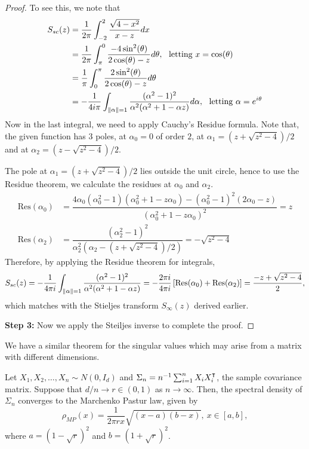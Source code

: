 \documentclass[12pt]{article}
\begin{document}
\begin{proof}
    To see this, we note that
    \begin{align*}
        S_{sc}(z) 
        & = \dfrac{1}{2\pi} \int_{-2}^2 \dfrac{\sqrt{4 - x^2}}{x - z}dx\\
        & = \dfrac{1}{2\pi} \int_{\pi}^0 \dfrac{-4\sin^2(\theta)}{2\cos(\theta) - z} d\theta, \ \text{ letting } x = \cos(\theta)\\
        & = \dfrac{1}{\pi} \int_0^\pi \dfrac{2\sin^2(\theta)}{2\cos(\theta) - z}d\theta\\
        & = -\dfrac{1}{4i\pi} \int_{\norm{\alpha} = 1} \dfrac{(\alpha^2 - 1)^2}{\alpha^2 (\alpha^2 + 1 - \alpha z)}d\alpha, \ \text{ letting } \alpha = e^{i\theta}
    \end{align*}
    \noindent Now in the last integral, we need to apply Cauchy's Residue formula. Note that, the given function has 3 poles, at $\alpha_0 = 0$ of order $2$, at $\alpha_1 = (z+\sqrt{z^2-4})/2$ and at $\alpha_2 = (z-\sqrt{z^2-4})/2$. 

    The pole at $\alpha_1 = (z + \sqrt{z^2-4})/2$ lies outside the unit circle, hence to use the Residue theorem, we calculate the residues at $\alpha_0$ and $\alpha_2$. 
    \begin{align*}
        \text{Res}(\alpha_0)
        & = \dfrac{4\alpha_0(\alpha_0^2 - 1)(\alpha_0^2 + 1 - z\alpha_0) - (\alpha_0^2 - 1)^2(2\alpha_0 - z)}{(\alpha^2_0 + 1 - z\alpha_0)^2} = z\\
        \text{Res}(\alpha_2)
        & = \dfrac{(\alpha_2^2 - 1)^2}{\alpha_2^2 (\alpha_2 - (z + \sqrt{z^2 -4})/2)} = -\sqrt{z^2-4}
    \end{align*}
    \noindent Therefore, by applying the Residue theorem for integrals,
    \begin{equation*}
        S_{sc}(z) = -\dfrac{1}{4\pi i} \int_{\left\Vert \alpha \right\Vert = 1} \dfrac{(\alpha^2 - 1)^2}{\alpha^2 (\alpha^2 + 1 - \alpha z)}
        = -\dfrac{2\pi i}{4\pi i} \left[ \text{Res}(\alpha_0) + \text{Res}(\alpha_2) \right] = \dfrac{-z+\sqrt{z^2 - 4}}{2},
    \end{equation*}
    \noindent which matches with the Stieljes transform $S_\infty(z)$ derived earlier.

    \noindent\textbf{Step 3:} Now we apply the Steiljes inverse to complete the proof.
\end{proof}

We have a similar theorem for the singular values which may arise from a matrix with different dimensions. 

\begin{theorembox}
    Let $X_1, X_2, \dots, X_n \sim N(0, I_d)$ and $\Sigma_n = n^{-1}\sum_{i=1}^n X_i X_i^{\intercal}$, the sample covariance matrix. Suppose that $d/n \rightarrow r \in (0, 1)$ as $n \rightarrow \infty$. Then, the spectral density of $\Sigma_n$ converges to the Marchenko Pastur law, given by
    \begin{equation*}
        \rho_{MP}(x) = \dfrac{1}{2\pi rx} \sqrt{(x-a)(b-x)}, \ x \in [a, b],
    \end{equation*}
    \noindent where $a = (1 - \sqrt{r})^2$ and $b = (1 + \sqrt{r})^2$.
\end{theorembox}
\end{document}
